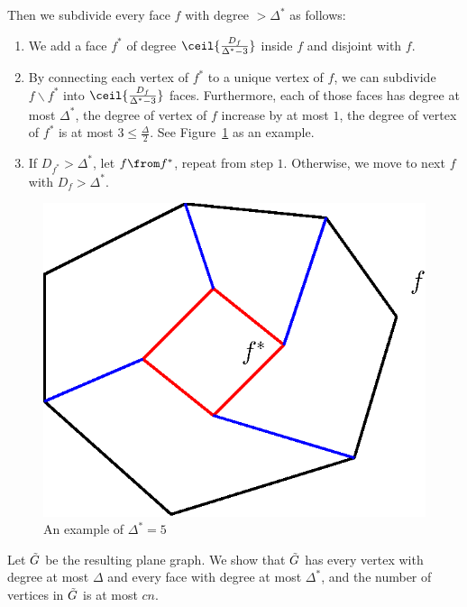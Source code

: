 \documentclass[11pt]{article}
\begin{document}
\begin{solution}
  \noindent Then we subdivide every face \(f\) with degree \(>\Delta^*\) as follows:\vspace{-5pt}
  \begin{enumerate}[(F.1)]\itemsep0pt
  \item We add a face \(f^*\) of degree \(\ceil{\frac{D_f}{\Delta^*-3}}\) inside \(f\) and disjoint with \(f\).
  \item By connecting each vertex of \(f^*\) to a unique vertex of \(f\), we can subdivide \(f\backslash f^*\) into \(\ceil{\frac{D_f}{\Delta^*-3}}\) faces. Furthermore, each of those faces has degree at most \(\Delta^*\), the degree of vertex of \(f\) increase by at most \(1\), the degree of vertex of \(f^*\) is at most \(3\le \frac{\Delta}{2}\). See Figure~\ref{fig:degree1} as an example.
  \item If \(D_{f^*}>\Delta^*\), let \(f\from f^*\), repeat from step \(1\). Otherwise, we move to next \(f\) with \(D_f>\Delta^*\).
  \end{enumerate}\vspace{-3pt}
  \begin{figure}[h]
  \centering
  \includegraphics[scale=0.5]{fig/prob2-1.eps}
  \caption{An example of \(\Delta^*=5\)}
  \label{fig:degree1}
\end{figure}

Let \(\Tilde{G}\) be the resulting plane graph. We show that \(\Tilde{G}\) has every vertex with degree at most \(\Delta\) and every face with degree at most \(\Delta^*\), and the number of vertices in \(\Tilde{G}\) is at most \(cn\).


\end{solution}
\end{document}
